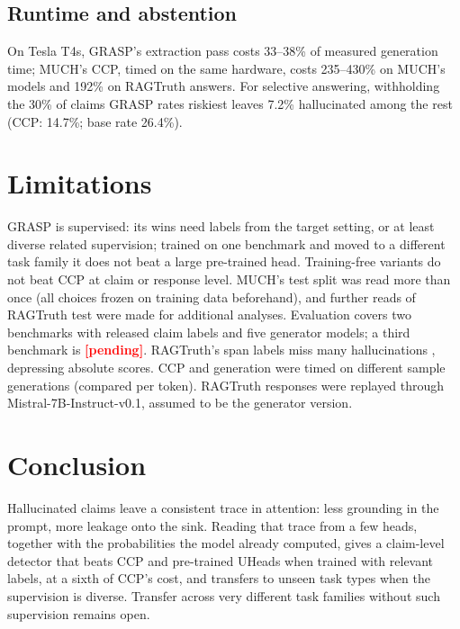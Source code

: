 \documentclass[11pt]{article}
\newcommand{\pending}{\textcolor{red}{\textbf{[pending]}}}
\begin{document}
\subsection{Runtime and abstention}
On Tesla T4s, GRASP's extraction pass costs 33--38\% of measured generation time; MUCH's CCP, timed on
the same hardware, costs 235--430\% on MUCH's models and 192\% on RAGTruth answers. For selective
answering, withholding the 30\% of claims GRASP rates riskiest leaves 7.2\% hallucinated among the rest
(CCP: 14.7\%; base rate 26.4\%).

\section{Limitations}
GRASP is supervised: its wins need labels from the target setting, or at least diverse related
supervision; trained on one benchmark and moved to a different task family it does not beat a large
pre-trained head. Training-free variants do not beat CCP at claim or response level. MUCH's test
split was read more than once (all choices frozen on training data beforehand), and further reads of
RAGTruth test were made for additional analyses. Evaluation covers two benchmarks with released claim
labels and five generator models; a third benchmark is \pending{}. RAGTruth's span labels miss many
hallucinations \citep{yu2026rt4chart}, depressing absolute scores. CCP and generation were timed on
different sample generations (compared per token). RAGTruth responses were replayed through
Mistral-7B-Instruct-v0.1, assumed to be the generator version.

\section{Conclusion}
Hallucinated claims leave a consistent trace in attention: less grounding in the prompt, more
leakage onto the sink. Reading that trace from a few heads, together with the probabilities the
model already computed, gives a claim-level detector that beats CCP and pre-trained UHeads when
trained with relevant labels, at a sixth of CCP's cost, and transfers to unseen task types when the
supervision is diverse. Transfer across very different task families without such supervision
remains open.



\end{document}
